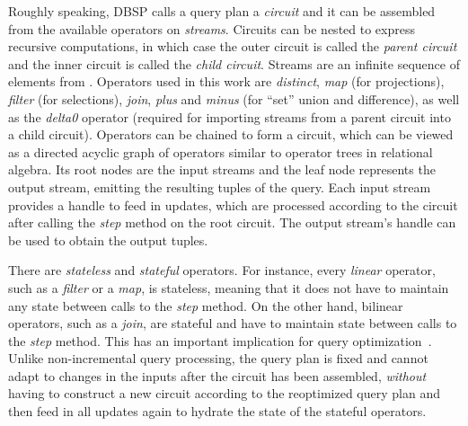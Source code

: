 
Roughly speaking, DBSP calls a query plan a \emph{circuit}
and it can be assembled from the available operators on \emph{streams}.
Circuits can be nested to express recursive computations, in which case
the outer circuit is called the \emph{parent circuit} and the inner circuit
is called the \emph{child circuit}.
Streams are an infinite sequence of elements from \zsets{}.
Operators used in this work are \emph{distinct},
\emph{map} (for projections), \emph{filter} (for selections),
\emph{join}, \emph{plus} and \emph{minus} (for ``set'' union and difference),
as well as the \emph{delta0} operator (required for importing streams
from a parent circuit into a child circuit).
Operators can be chained to form a circuit, which can be viewed as
a directed acyclic graph of operators similar to operator trees in relational algebra.
Its root nodes are the input streams and the leaf node represents the output
stream, emitting the resulting tuples of the query.
Each input stream provides a handle to feed in updates, which are processed
according to the circuit after calling the \emph{step} method on the root
circuit.
The output stream's handle can be used to obtain the output tuples.

There are \emph{stateless} and \emph{stateful} operators.
For instance, every \emph{linear} operator, such as a \emph{filter} or a \emph{map},
is stateless, meaning that it does not have to maintain any state between
calls to the \emph{step} method.
On the other hand, bilinear operators, such as a \emph{join}, are stateful
and have to maintain state between calls to the \emph{step} method.
This has an important implication for query optimization~\cite{budiu2025dbsp}.
Unlike non-incremental query processing, the query plan is fixed and cannot
adapt to changes in the inputs after the circuit has been assembled,
\emph{without} having to construct a new circuit according to the
reoptimized query plan and then feed in all updates again to hydrate
the state of the stateful operators.
